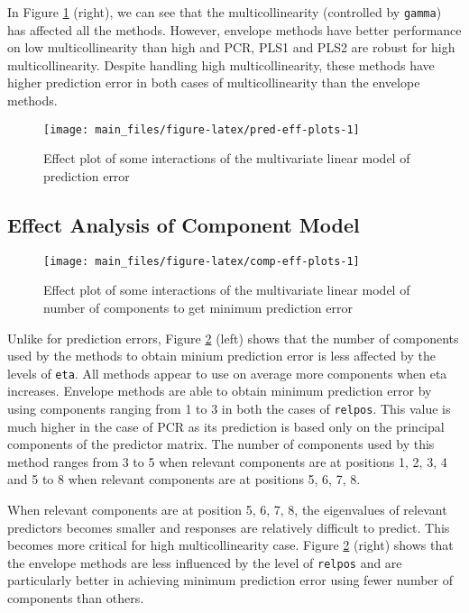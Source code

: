 \documentclass[12pt,3p,authoryear]{elsarticle}
\begin{document}
In Figure \ref{fig:pred-eff-plots} (right), we can see that the
multicollinearity (controlled by \texttt{gamma}) has affected all the
methods. However, envelope methods have better performance on low
multicollinearity than high and PCR, PLS1 and PLS2 are robust for high
multicollinearity. Despite handling high multicollinearity, these
methods have higher prediction error in both cases of multicollinearity
than the envelope methods.




\begin{figure}
\texttt{[image: main\_files/figure-latex/pred-eff-plots-1]} \caption{Effect plot of some interactions of the multivariate
linear model of prediction error}\label{fig:pred-eff-plots}
\end{figure}

\subsection{Effect Analysis of Component
Model}\label{effect-analysis-of-component-model}




\begin{figure}[!htb]
\texttt{[image: main\_files/figure-latex/comp-eff-plots-1]} \caption{Effect plot of some interactions of the multivariate
linear model of number of components to get minimum prediction error}\label{fig:comp-eff-plots}
\end{figure}

Unlike for prediction errors, Figure \ref{fig:comp-eff-plots} (left)
shows that the number of components used by the methods to obtain minium
prediction error is less affected by the levels of \texttt{eta}. All
methods appear to use on average more components when eta increases.
Envelope methods are able to obtain minimum prediction error by using
components ranging from 1 to 3 in both the cases of \texttt{relpos}.
This value is much higher in the case of PCR as its prediction is based
only on the principal components of the predictor matrix. The number of
components used by this method ranges from 3 to 5 when relevant
components are at positions 1, 2, 3, 4 and 5 to 8 when relevant
components are at positions 5, 6, 7, 8.

When relevant components are at position 5, 6, 7, 8, the eigenvalues of
relevant predictors becomes smaller and responses are relatively
difficult to predict. This becomes more critical for high
multicollinearity case. Figure \ref{fig:comp-eff-plots} (right) shows
that the envelope methods are less influenced by the level of
\texttt{relpos} and are particularly better in achieving minimum
prediction error using fewer number of components than others.
\end{document}
